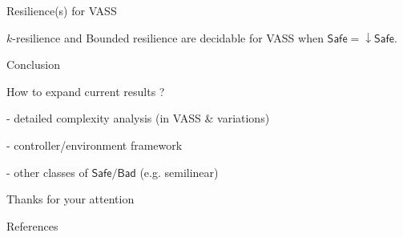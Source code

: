 \documentclass{beamer}
\newcommand{\Bad}{\textsf{Bad}}
\newcommand{\Safe}{\textsf{Safe}}
\begin{document}
  \begin{frame}{Resilience(s) for VASS}

\begin{theorem}\label{vass down}
{\sc $k$-resilience }  and {\sc Bounded resilience} are decidable for VASS when 
$\Safe = \mathop{\downarrow} \Safe$.
\end{theorem}



  \end{frame}
  \begin{frame}{Conclusion}
  

How to expand current results ?

- detailed complexity analysis (in VASS \& variations)

- controller/environment framework

- other classes of $\Safe / \Bad$ (e.g. semilinear)


  \end{frame}
  \begin{frame}
  
  \begin{center}
  Thanks for your attention
  \end{center}
  
  \end{frame}
  \begin{frame}{References}
      
      {\tiny

}


  \end{frame}

 
  
\end{document}
